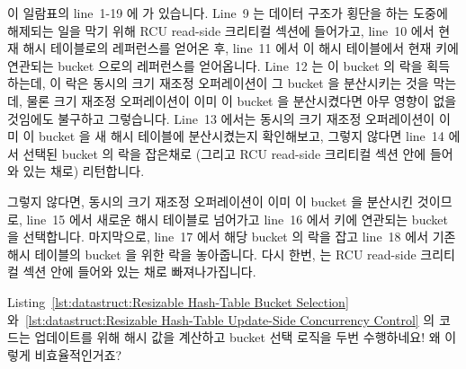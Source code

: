 이 일람표의 line~1-19 에  가 있습니다.
Line~9 는 데이터 구조가 횡단을 하는 도중에 해제되는 일을 막기 위해 RCU
read-side 크리티컬 섹션에 들어가고, line~10 에서 현재 해시 테이블로의
레퍼런스를 얻어온 후, line~11 에서 이 해시 테이블에서 현재 키에 연관되는 bucket
으로의 레퍼런스를 얻어옵니다.
Line~12 는 이 bucket 의 락을 획득하는데, 이 락은 동시의 크기 재조정
오퍼레이션이 그 bucket 을 분산시키는 것을 막는데, 물론 크기 재조정 오퍼레이션이
이미 이 bucket 을 분산시켰다면 아무 영향이 없을 것임에도 불구하고 그렇습니다.
Line~13 에서는 동시의 크기 재조정 오퍼레이션이 이미 이 bucket 을 새 해시
테이블에 분산시켰는지 확인해보고, 그렇지 않다면 line~14 에서 선택된 bucket 의
락을 잡은채로 (그리고 RCU read-side 크리티컬 섹션 안에 들어와 있는 채로)
리턴합니다.

그렇지 않다면, 동시의 크기 재조정 오퍼레이션이 이미 이 bucket 을 분산시킨
것이므로, line~15 에서 새로운 해시 테이블로 넘어가고 line~16 에서 키에 연관되는
bucket 을 선택합니다.
마지막으로, line~17 에서 해당 bucket 의 락을 잡고 line~18 에서 기존 해시
테이블의 bucket 을 위한 락을 놓아줍니다.
다시 한번,  는 RCU read-side 크리티컬 섹션 안에 들어와
있는 채로 빠져나가집니다.

\QuickQuiz{}
	Listing~\ref{lst:datastruct:Resizable Hash-Table Bucket Selection}
	와~\ref{lst:datastruct:Resizable Hash-Table Update-Side Concurrency Control}
	의 코드는 업데이트를 위해 해시 값을 계산하고 bucket 선택 로직을 두번
	수행하네요!
	왜 이렇게 비효율적인거죠?
	\iffalse

